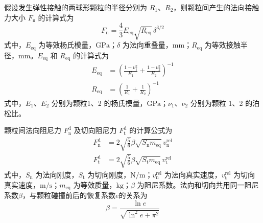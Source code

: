 

假设发生弹性接触的两球形颗粒的半径分别为 \(R_{1}\)、\(R_{2}\)，则颗粒间产生的法向接触力大小 \(F_{\mathrm{n}}\) 的计算式为
\begin{equation}
	F_{\mathrm{n}}=\frac{4}{3}E_{\mathrm{eq}}\sqrt{R_{\mathrm{eq}}}\,\delta^{3/2}
	\label{eq:normal_particle_elastic_force}
\end{equation}
式中，\(E_{\mathrm{eq}}\) 为等效杨氏模量，$\mathrm{GPa}$；\(\delta\) 为法向重叠量，$\mathrm{mm}$；\(R_{\mathrm{eq}}\) 为等效接触半径，$\mathrm{mm}$。\(E_{\mathrm{eq}}\) 和 \(R_{\mathrm{eq}}\) 的计算式为
\begin{equation}
	\begin{aligned}
		E_{\mathrm{eq}} & = \left(\frac{1 - \nu_1^2}{E_1} + \frac{1 - \nu_2^2}{E_2} \right)^{-1}\\
	R_{\mathrm{eq}} & =\left(\frac{1}{R_{1}}+\frac{1}{R_{2}}\right)^{-1}
	\end{aligned}
\end{equation}
式中，\(E_{1}\)、\(E_{2}\) 分别为颗粒1、2 的杨氏模量，$\mathrm{GPa}$；\( \nu_{1} \)、\( \nu_{2} \) 分别为颗粒 1、2 的泊松比。


颗粒间法向阻尼力 \(F_{\mathrm{n}}^{\mathrm{d}}\) 及切向阻尼力 \(F_{\mathrm{t}}^{\mathrm{d}}\) 的计算公式为
\begin{equation}
	\begin{aligned}
	F_{\mathrm{n}}^{\mathrm{d}} &= 2\sqrt{\frac{5}{6}}\beta\sqrt{S_{\mathrm{n}}m_{\mathrm{eq}}}\,v_{\mathrm{n}}^{\mathrm{rel}}\\
	F_{\mathrm{t}}^{\mathrm{d}} &= 2\sqrt{\frac{5}{6}}\beta\sqrt{S_{\mathrm{t}}m_{\mathrm{eq}}}\,v_{\mathrm{t}}^{\mathrm{rel}}
	\end{aligned}
	\label{eq:normal_shear_damping_force}
\end{equation}
式中，\(S_{\mathrm{n}}\) 为法向刚度，\(S_{\mathrm{t}}\) 为切向刚度，$\mathrm{N/m}$；\(v_{\mathrm{n}}^{\mathrm{rel}}\) 为法向真实速度，\(v_{\mathrm{t}}^{\mathrm{rel}}\) 为切向真实速度，$\mathrm{m/s}$；\(m_{\mathrm{eq}}\) 为等效质量，\(\mathrm{kg}\)；\(\beta\) 为阻尼系数。法向和切向共用同一阻尼系数\(\beta\)，与颗粒碰撞前后的恢复系数\(e\)的关系为
\begin{equation}
	\beta = \frac{\ln e}{\sqrt{\ln^2 e + \pi ^2}}
\end{equation}


